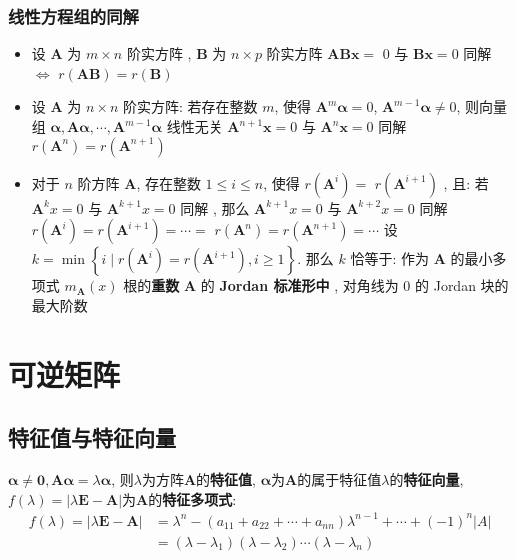 \documentclass{article}
\begin{document}
			\subsubsection{线性方程组的同解}
				\begin{itemize}
					\item 设 $\boldsymbol A$ 为 $m \times n$ 阶实方阵 , $\boldsymbol B$ 为 $n \times p$ 阶实方阵
					$\boldsymbol A \boldsymbol B \boldsymbol x=$ 0 与 $\boldsymbol B \boldsymbol x=0$ 同解$\Leftrightarrow$ $r(\boldsymbol A \boldsymbol B)=r(\boldsymbol B)$
					\item 设 $\boldsymbol A$ 为 $n \times n$ 阶实方阵:
					\subitem 若存在整数 $m$, 使得 $\boldsymbol A^{m} \boldsymbol \alpha=0$, $\boldsymbol A^{m-1} \boldsymbol \alpha \neq 0$, 则向量组 $\boldsymbol \alpha, \boldsymbol A \boldsymbol \alpha, \cdots, \boldsymbol A^{m-1} \boldsymbol \alpha$ 线性无关
					\subitem $\boldsymbol A^{n+1} \boldsymbol x=0$ 与 $\boldsymbol A^{n} \boldsymbol x=0$ 同解
					\subitem $r\left(\boldsymbol A^{n}\right)=r\left(\boldsymbol A^{n+1}\right)$
					\item 对于 $n$ 阶方阵 $\boldsymbol A$, 存在整数 $1 \leq i \leq n$, 使得 $r\left(\boldsymbol A^{i}\right)=$ $r\left(\boldsymbol A^{i+1}\right)$ , 且:
					\subitem 若 $\boldsymbol A^{k} x=0$ 与 $\boldsymbol A^{k+1} x=0$ 同解 , 那么 $\boldsymbol A^{k+1} x=0$ 与 $\boldsymbol A^{k+2} x=0$ 同解
					\subitem $r\left(\boldsymbol A^{i}\right)=r\left(\boldsymbol A^{i+1}\right)=\cdots=$ $r\left(\boldsymbol A^{n}\right)=r\left(\boldsymbol A^{n+1}\right)=\cdots$
					\subitem 设 $k=\min \left\{i \mid r\left(\boldsymbol A^{i}\right)=r\left(\boldsymbol A^{i+1}\right), i \geq 1\right\}$. 那么 $k$ 恰等于:
					 作为 $\boldsymbol A$ 的最小多项式 $m_{\boldsymbol A}(x)$ 根的\textbf{重数}
					\subsubitem $\boldsymbol A$ 的 \textbf{Jordan 标准形中} , 对角线为 0 的 Jordan 块的最大阶数
				\end{itemize}
	\section{可逆矩阵}
		\subsection{特征值与特征向量}
			$\boldsymbol\alpha\neq\mathbf 0, \boldsymbol{A\alpha} =\lambda \boldsymbol\alpha$, 则$\lambda$为方阵$\boldsymbol A$的\textbf{特征值}, $\boldsymbol\alpha$为$\boldsymbol A$的属于特征值$\lambda$的\textbf{特征向量}, $f(\lambda )=|\lambda \boldsymbol E-\boldsymbol A|$为$\boldsymbol A$的\textbf{特征多项式}:
			$$
			\begin{array}{cl}
			f(\lambda )=|\lambda \boldsymbol E-\boldsymbol A| & = \lambda^{n}-\left(a_{11}+a_{22}+\cdots+a_{n n}\right) \lambda^{n-1}+\cdots+(-1)^{n}|A| \\
			& = \left(\lambda-\lambda_{1}\right)\left(\lambda-\lambda_{2}\right) \cdots\left(\lambda-\lambda_{n}\right)
			\end{array}
			$$
\end{document}
